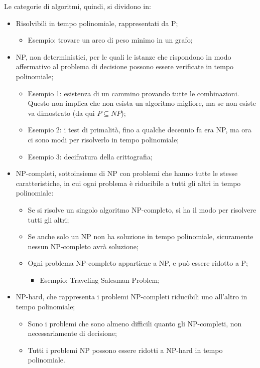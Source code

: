 Le categorie di algoritmi, quindi, si dividono in:
\begin{itemize}
	\item Risolvibili in tempo polinomiale, rappresentati da P;
	\begin{itemize}
		\item Esempio: trovare un arco di peso minimo in un grafo;
	\end{itemize}
	\item NP, non deterministici, per le quali le istanze che rispondono in modo affermativo al problema di decisione possono essere verificate in tempo polinomiale;
	\begin{itemize}
		\item Esempio 1: esistenza di un cammino provando tutte le combinazioni. Questo non implica che non esista un algoritmo migliore, ma se non esiste va dimostrato (da qui $P \subseteq NP$);
		\item Esempio 2: i test di primalità, fino a qualche decennio fa era NP, ma ora ci sono modi per risolverlo in tempo polinomiale;
		\item Esempio 3: decifratura della crittografia;
	\end{itemize}
	\item NP-completi, sottoinsieme di NP con problemi che hanno tutte le stesse caratteristiche, in cui ogni problema è riducibile a tutti gli altri in tempo polinomiale:
	\begin{itemize}
		\item Se si risolve un singolo algoritmo NP-completo, si ha il modo per risolvere tutti gli altri;
		\item Se anche solo un NP non ha soluzione in tempo polinomiale, sicuramente nessun NP-completo avrà soluzione;
		\item Ogni problema NP-completo appartiene a NP, e può essere ridotto a P; 
		\begin{itemize}
			\item Esempio: Traveling Salesman Problem;
		\end{itemize}
	\end{itemize}
	\item NP-hard, che rappresenta i problemi NP-completi riducibili uno all'altro in tempo polinomiale;
	\begin{itemize}
		\item Sono i problemi che sono almeno difficili quanto gli NP-completi, non necessariamente di decisione;
		\item Tutti i problemi NP possono essere ridotti a NP-hard in tempo polinomiale.
	\end{itemize}
\end{itemize}

